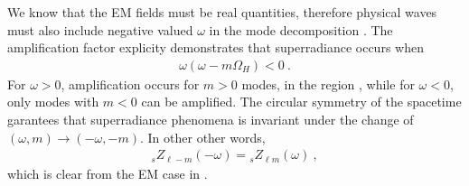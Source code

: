 We know that the EM fields must be real quantities, therefore physical waves must also include negative valued $\omega$ in the mode decomposition .
The amplification factor explicity demonstrates that superradiance occurs when
\begin{align}
    \label{eq3:superradiance}
    \omega(\omega-m\Omega_H)<0 ~.
\end{align}
For $\omega>0$, amplification occurs for $m>0$ modes, in the region , while for $\omega<0$, only modes with $m<0$ can be amplified.
The circular symmetry of the spacetime garantees that superradiance phenomena is invariant under the change of $(\omega,m)\to(-\omega,-m)$.
In other other words,
\begin{align}
    {}_{s}Z_{\ell-m}(-\omega) = {}_{s}Z_{\ell m}(\omega) ~,
\end{align}
which is clear from the EM case in .


\cleardoublepage